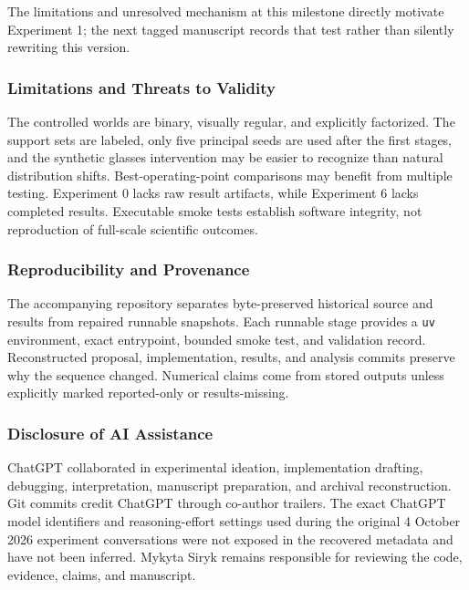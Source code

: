 \documentclass[
  10pt,
]{article}
\begin{document}
The limitations and unresolved mechanism at this milestone directly
motivate Experiment 1; the next tagged manuscript records that test
rather than silently rewriting this version.

\hypertarget{limitations-and-threats-to-validity}{%
\subsubsection{Limitations and Threats to
Validity}\label{limitations-and-threats-to-validity}}

The controlled worlds are binary, visually regular, and explicitly
factorized. The support sets are labeled, only five principal seeds are
used after the first stages, and the synthetic glasses intervention may
be easier to recognize than natural distribution shifts.
Best-operating-point comparisons may benefit from multiple testing.
Experiment 0 lacks raw result artifacts, while Experiment 6 lacks
completed results. Executable smoke tests establish software integrity,
not reproduction of full-scale scientific outcomes.

\hypertarget{reproducibility-and-provenance}{%
\subsubsection{Reproducibility and
Provenance}\label{reproducibility-and-provenance}}

The accompanying repository separates byte-preserved historical source
and results from repaired runnable snapshots. Each runnable stage
provides a \texttt{uv} environment, exact entrypoint, bounded smoke
test, and validation record. Reconstructed proposal, implementation,
results, and analysis commits preserve why the sequence changed.
Numerical claims come from stored outputs unless explicitly marked
reported-only or results-missing.

\hypertarget{disclosure-of-ai-assistance}{%
\subsubsection{Disclosure of AI
Assistance}\label{disclosure-of-ai-assistance}}

ChatGPT collaborated in experimental ideation, implementation drafting,
debugging, interpretation, manuscript preparation, and archival
reconstruction. Git commits credit ChatGPT through co-author trailers.
The exact ChatGPT model identifiers and reasoning-effort settings used
during the original 4 October 2026 experiment conversations were not
exposed in the recovered metadata and have not been inferred. Mykyta
Siryk remains responsible for reviewing the code, evidence, claims, and
manuscript.
\end{document}
